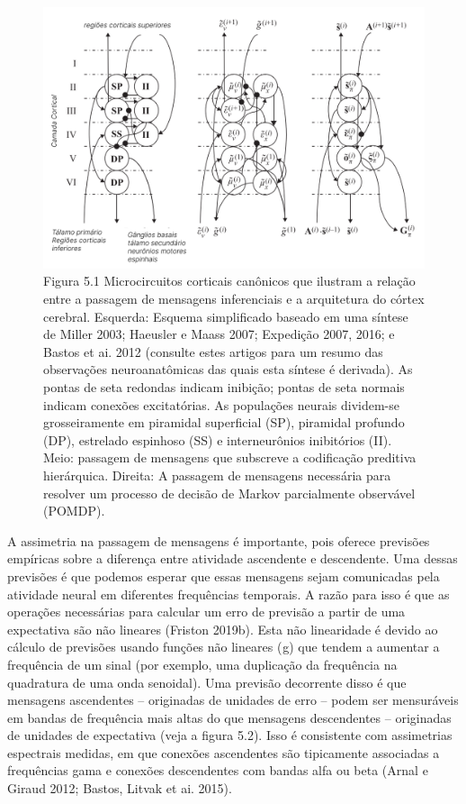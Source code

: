 \documentclass[
  12pt,
]{book}
\begin{document}
\begin{figure}
\centering
\includegraphics{images/Figura_5_1.png}
\caption{Figura 5.1 Microcircuitos corticais canônicos que ilustram a relação entre a passagem de mensagens inferenciais e a arquitetura do córtex cerebral. Esquerda: Esquema simplificado baseado em uma síntese de Miller 2003; Haeusler e Maass 2007; Expedição 2007, 2016; e Bastos et ai. 2012 (consulte estes artigos para um resumo das observações neuroanatômicas das quais esta síntese é derivada). As pontas de seta redondas indicam inibição; pontas de seta normais indicam conexões excitatórias. As populações neurais dividem-se grosseiramente em piramidal superficial (SP), piramidal profundo (DP), estrelado espinhoso (SS) e interneurônios inibitórios (II). Meio: passagem de mensagens que subscreve a codificação preditiva hierárquica. Direita: A passagem de mensagens necessária para resolver um processo de decisão de Markov parcialmente observável (POMDP).}
\end{figure}

A assimetria na passagem de mensagens é importante, pois oferece previsões empíricas sobre a diferença entre atividade ascendente e descendente. Uma dessas previsões é que podemos esperar que essas mensagens sejam comunicadas pela atividade neural em diferentes frequências temporais. A razão para isso é que as operações necessárias para calcular um erro de previsão a partir de uma expectativa são não lineares (Friston 2019b). Esta não linearidade é devido ao cálculo de previsões usando funções não lineares ( g) que tendem a aumentar a frequência de um sinal (por exemplo, uma duplicação da frequência na quadratura de uma onda senoidal). Uma previsão decorrente disso é que mensagens ascendentes -- originadas de unidades de erro -- podem ser mensuráveis \hspace{0pt}\hspace{0pt}em bandas de frequência mais altas do que mensagens descendentes -- originadas de unidades de expectativa (veja a figura 5.2). Isso é consistente com assimetrias espectrais medidas, em que conexões ascendentes são tipicamente associadas a frequências gama e conexões descendentes com bandas alfa ou beta (Arnal e Giraud 2012; Bastos, Litvak et ai. 2015).
\end{document}
